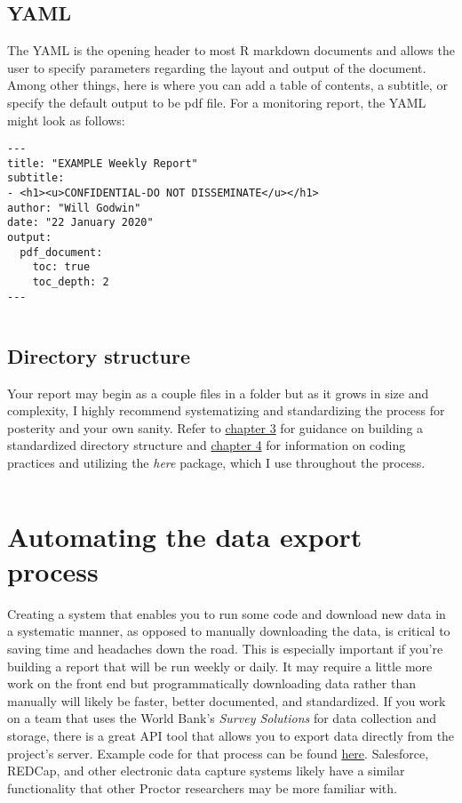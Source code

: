 \documentclass[
]{book}
\begin{document}
\hypertarget{yaml}{%
\subsection{YAML}\label{yaml}}

The YAML is the opening header to most R markdown documents and allows the user to specify parameters regarding the layout and output of the document. Among other things, here is where you can add a table of contents, a subtitle, or specify the default output to be pdf file. For a monitoring report, the YAML might look as follows:

\begin{verbatim}
---
title: "EXAMPLE Weekly Report"
subtitle:
- <h1><u>CONFIDENTIAL-DO NOT DISSEMINATE</u></h1>
author: "Will Godwin"
date: "22 January 2020"
output:
  pdf_document:
    toc: true
    toc_depth: 2
---
\end{verbatim}

\(~\)

\hypertarget{directory-structure-1}{%
\subsection{Directory structure}\label{directory-structure-1}}

Your report may begin as a couple files in a folder but as it grows in size and complexity, I highly recommend systematizing and standardizing the process for posterity and your own sanity. Refer to \href{directory-structure-and-code-repositories.html}{chapter 3} for guidance on building a standardized directory structure and \href{codingpractices.html}{chapter 4} for information on coding practices and utilizing the \emph{here} package, which I use throughout the process.

\(~\)

\hypertarget{automating-the-data-export-process}{%
\section{Automating the data export process}\label{automating-the-data-export-process}}

Creating a system that enables you to run some code and download new data in a systematic manner, as opposed to manually downloading the data, is critical to saving time and headaches down the road. This is especially important if you're building a report that will be run weekly or daily. It may require a little more work on the front end but programmatically downloading data rather than manually will likely be faster, better documented, and standardized. If you work on a team that uses the World Bank's \emph{Survey Solutions} for data collection and storage, there is a great API tool that allows you to export data directly from the project's server. Example code for that process can be found \href{templates/api_example.R}{here}. Salesforce, REDCap, and other electronic data capture systems likely have a similar functionality that other Proctor researchers may be more familiar with.
\end{document}
